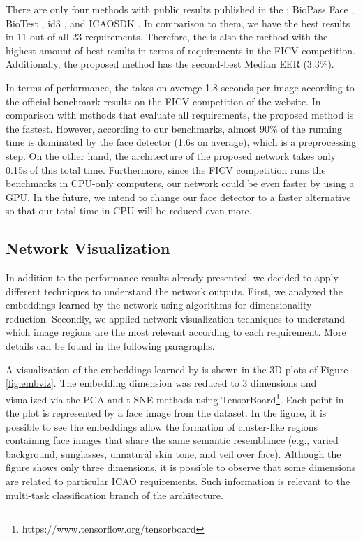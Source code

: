 

There are only four methods with public results published in the \fvcongoing: BioPass Face \citep{fvcVsoft}, BioTest \citep{fvcBioTest}, id3 \citep{fvcICAOCompliance}, and ICAOSDK \citep{fvcSeamfix}. In comparison to them, we have the best results in 11 out of all 23 requirements. Therefore, the \methodname is also the method with the highest amount of best results in terms of requirements in the FICV competition. Additionally, the proposed method has the second-best Median EER (3.3\%).

In terms of performance, the \methodname takes on average 1.8 seconds per image according to the official benchmark results on the FICV competition of the \fvcongoing website. In comparison with methods that evaluate all requirements, the proposed method is the fastest. However, according to our benchmarks, almost 90\% of the \methodname running time is dominated by the face detector (1.6s on average), which is a preprocessing step. On the other hand, the architecture of the proposed network takes only 0.15s of this total time. Furthermore, since the FICV competition runs the benchmarks in CPU-only computers, our network could be even faster by using a GPU. In the future, we intend to change our face detector to a faster alternative so that our total time in CPU will be reduced even more.

\subsection{Network Visualization} \label{sec:netviz}

In addition to the performance results already presented, we decided to apply different techniques to understand the network outputs. First, we analyzed the embeddings learned by the network using algorithms for dimensionality reduction. Secondly, we applied network visualization techniques to understand which image regions are the most relevant according to each requirement. More details can be found in the following paragraphs.

A visualization of the embeddings learned by \methodname is shown in the 3D plots of Figure \ref{fig:embviz}. The embedding dimension was reduced to 3 dimensions and visualized via the PCA \citep{pca} and t-SNE \citep{tsne} methods using TensorBoard\footnote{https://www.tensorflow.org/tensorboard}. Each point in the plot is represented by a face image from the dataset. In the figure, it is possible to see the embeddings allow the formation of cluster-like regions containing face images that share the same semantic resemblance (e.g., varied background, sunglasses, unnatural skin tone, and veil over face). Although the figure shows only three dimensions, it is possible to observe that some dimensions are related to particular ICAO requirements. Such information is relevant to the multi-task classification branch of the \methodname architecture. 

